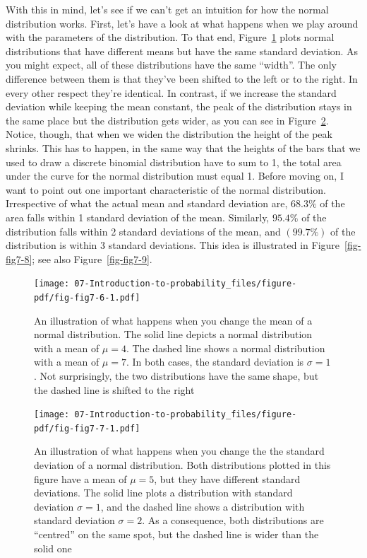 \documentclass[
  a4paper,
]{book}
\begin{document}
With this in mind, let's see if we can't get an intuition for how the
normal distribution works. First, let's have a look at what happens when
we play around with the parameters of the distribution. To that end,
Figure~\ref{fig-fig7-6} plots normal distributions that have different
means but have the same standard deviation. As you might expect, all of
these distributions have the same ``width''. The only difference between
them is that they've been shifted to the left or to the right. In every
other respect they're identical. In contrast, if we increase the
standard deviation while keeping the mean constant, the peak of the
distribution stays in the same place but the distribution gets wider, as
you can see in Figure~\ref{fig-fig7-7}. Notice, though, that when we
widen the distribution the height of the peak shrinks. This has to
happen, in the same way that the heights of the bars that we used to
draw a discrete binomial distribution have to sum to 1, the total area
under the curve for the normal distribution must equal 1. Before moving
on, I want to point out one important characteristic of the normal
distribution. Irrespective of what the actual mean and standard
deviation are, \(68.3\%\) of the area falls within 1 standard deviation
of the mean. Similarly, \(95.4\%\) of the distribution falls within 2
standard deviations of the mean, and \((99.7\%)\) of the distribution is
within 3 standard deviations. This idea is illustrated in
Figure~\ref{fig-fig7-8}; see also Figure~\ref{fig-fig7-9}.

\begin{figure}

\texttt{[image: 07-Introduction-to-probability\_files/figure-pdf/fig-fig7-6-1.pdf]} \hfill{}

\caption{\label{fig-fig7-6}An illustration of what happens when you
change the mean of a normal distribution. The solid line depicts a
normal distribution with a mean of \(\mu = 4\). The dashed line shows a
normal distribution with a mean of \(\mu = 7\). In both cases, the
standard deviation is \(\sigma = 1\). Not surprisingly, the two
distributions have the same shape, but the dashed line is shifted to the
right}

\end{figure}

\begin{figure}

\texttt{[image: 07-Introduction-to-probability\_files/figure-pdf/fig-fig7-7-1.pdf]} \hfill{}

\caption{\label{fig-fig7-7}An illustration of what happens when you
change the the standard deviation of a normal distribution. Both
distributions plotted in this figure have a mean of \(\mu = 5\), but
they have different standard deviations. The solid line plots a
distribution with standard deviation \(\sigma = 1\), and the dashed line
shows a distribution with standard deviation \(\sigma = 2\). As a
consequence, both distributions are ``centred'' on the same spot, but
the dashed line is wider than the solid one}

\end{figure}
\end{document}
